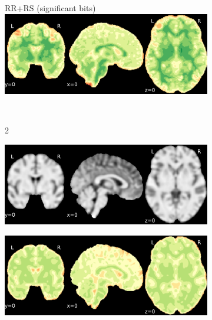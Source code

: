 \documentclass{article}
\begin{document}
\begin{landscape}
\begin{figure}
\begin{subfigure}[t]{0.2\paperheight}
        \end{subfigure}
        \begin{subfigure}[t]{0.2\paperheight}
            \centering
            RR+RS (significant bits)
            \includegraphics[width=\textwidth]{figures/sig/fwhm_5/rr.rs_ds001600_sub-1_sig.pdf}
        \end{subfigure} \\
        \begin{subfigure}[b][][c]{0.01\paperwidth} 2 \vspace*{15pt} \end{subfigure}
        \begin{subfigure}[t]{0.2\paperheight}
            \centering
            \includegraphics[width=\textwidth]{figures/ieee_T1/fwhm_5/ieee_ds001771_sub-36.pdf}
        \end{subfigure}
        \begin{subfigure}[t]{0.2\paperheight}
            \centering
            \includegraphics[width=\textwidth]{figures/sig/fwhm_5/rr_ds001771_sub-36_sig.pdf}

\end{subfigure}
\end{figure}
\end{landscape}
\end{document}
